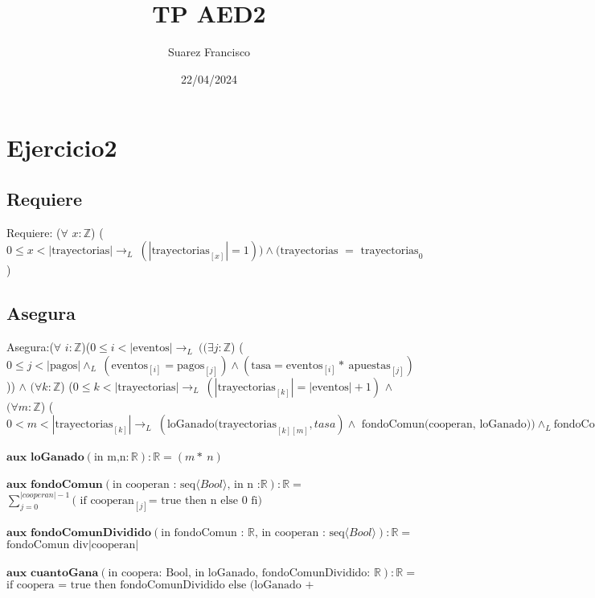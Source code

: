 \documentclass[10pt, a4paper]{article} %
\author{Suarez Francisco}
\date{22/04/2024}
\title{TP AED2}
\begin{document}
\section{Ejercicio2}
\subsection{Requiere}
Requiere: ($\forall$ \(x :  \mathbb{Z} \)) (\(0 \leq x < |\text{trayectorias}| \rightarrow _{L}\  (|\text{trayectorias}_{[x]}| = 1))  \land ( \text{trayectorias } = \text{ trayectorias}_{0}\))
\subsection{Asegura}
Asegura:($\forall$ \( i :  \mathbb{Z} \))(\(0 \leq i < |\text{eventos}| \rightarrow _{L}\ ((\exists  j :  \mathbb{Z} \)) (\(0 \leq j < |\text{pagos}| \land _{L}\ (\text{eventos}_{[i]} = \text{pagos}_{[j]}) \land ( \text{tasa} = \text{eventos}_{[i]} \ast\ \text{apuestas}_{[j]})\))) \(\land\) \((\forall k : \mathbb{Z} \)) (\(0 \leq k < |\text{trayectorias}| \rightarrow _{L}\ (|\text{trayectorias}_{[k]}| = |\text{eventos}| + 1)\) \(\land\) \((\forall m : \mathbb{Z} \)) (\(0 < m < |\text{trayectorias}_{[k]}| \rightarrow_{L}\ (\text{loGanado(trayectorias}_{[k][m]} , tasa) \land \text{ fondoComun(cooperan, loGanado)}) \land_{L} \text{fondoComunDividido(fondoComun,cooperan)} \land_{L} (\text{trayectorias}_{[k][m]} = \text{cuantoGana(} \text{cooperan}_{[k]} \text{, loGanado, fondoComunDividido)}) \land \text{trayectorias}_{[k][0]} = \text{trayectorias}_{0[k][0]}) \) 
\\ \\
$\textbf{aux loGanado} (\text{in m,n} : \mathbb{R}) : \mathbb{R} = (m \ast\ n)$ \\ \\
$\textbf{aux fondoComun} (\text{in cooperan : seq} \langle Bool \rangle \text{, in n :} \mathbb{R}) : \mathbb{R} =$\\
$\sum_{j=0}^{|cooperan|-1} \text{( if} \text{ cooperan}_{[j]} \text{= true then n else 0 fi)}$ 
\\ \\
$\textbf{aux fondoComunDividido} (\text{in fondoComun : }	\mathbb{R}	\text{, in cooperan : seq} \langle Bool \rangle)  : \mathbb{R} = $\\
$ \text{fondoComun div} |\text{cooperan}|$
\\ \\
$\textbf{aux cuantoGana} (\text{in coopera: Bool, in loGanado, fondoComunDividido: }  \mathbb{R}) : \mathbb{R} =$ \\
$\text{if coopera = true then fondoComunDividido else (loGanado + fondoComunDividido}$
\end{document}
